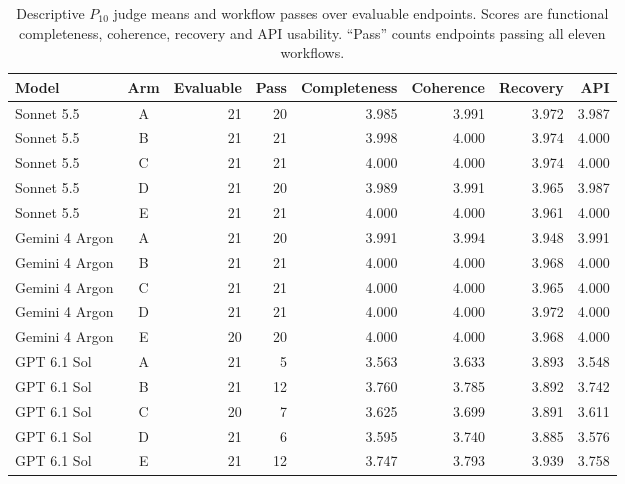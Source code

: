 \FloatBarrier

\begin{table}[!htbp]
\centering\footnotesize
\setlength{\tabcolsep}{4pt}
\caption{Descriptive $P_{10}$ judge means and workflow passes over evaluable
endpoints. Scores are functional completeness, coherence, recovery and
API usability. ``Pass'' counts endpoints passing all eleven workflows.}\label{tab:resultsjudgemeans}

\begin{tabular*}{\textwidth}{@{\extracolsep{\fill}}lcrrrrrr@{}}
\toprule
Model & Arm & Evaluable & Pass & Completeness & Coherence & Recovery & API \\
\midrule
Sonnet 5.5 & A & 21 & 20 & 3.985 & 3.991 & 3.972 & 3.987 \\
Sonnet 5.5 & B & 21 & 21 & 3.998 & 4.000 & 3.974 & 4.000 \\
Sonnet 5.5 & C & 21 & 21 & 4.000 & 4.000 & 3.974 & 4.000 \\
Sonnet 5.5 & D & 21 & 20 & 3.989 & 3.991 & 3.965 & 3.987 \\
Sonnet 5.5 & E & 21 & 21 & 4.000 & 4.000 & 3.961 & 4.000 \\
\midrule
Gemini 4 Argon & A & 21 & 20 & 3.991 & 3.994 & 3.948 & 3.991 \\
Gemini 4 Argon & B & 21 & 21 & 4.000 & 4.000 & 3.968 & 4.000 \\
Gemini 4 Argon & C & 21 & 21 & 4.000 & 4.000 & 3.965 & 4.000 \\
Gemini 4 Argon & D & 21 & 21 & 4.000 & 4.000 & 3.972 & 4.000 \\
Gemini 4 Argon & E & 20 & 20 & 4.000 & 4.000 & 3.968 & 4.000 \\
\midrule
GPT 6.1 Sol & A & 21 & 5 & 3.563 & 3.633 & 3.893 & 3.548 \\
GPT 6.1 Sol & B & 21 & 12 & 3.760 & 3.785 & 3.892 & 3.742 \\
GPT 6.1 Sol & C & 20 & 7 & 3.625 & 3.699 & 3.891 & 3.611 \\
GPT 6.1 Sol & D & 21 & 6 & 3.595 & 3.740 & 3.885 & 3.576 \\
GPT 6.1 Sol & E & 21 & 12 & 3.747 & 3.793 & 3.939 & 3.758 \\
\bottomrule
\end{tabular*}
\end{table}

